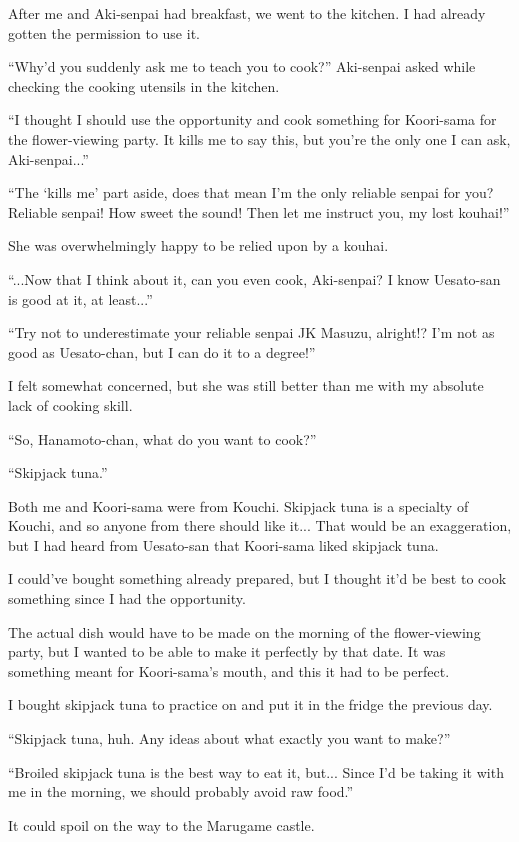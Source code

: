 After me and Aki-senpai had breakfast, we went to the kitchen. I had already gotten the permission to use it.

``Why'd you suddenly ask me to teach you to cook?'' Aki-senpai asked while checking the cooking utensils in the kitchen.

``I thought I should use the opportunity and cook something for Koori-sama for the flower-viewing party. It kills me to say this, but you're the only one I can ask, Aki-senpai...''

``The `kills me' part aside, does that mean I'm the only reliable senpai for you? Reliable senpai! How sweet the sound! Then let me instruct you, my lost kouhai!''

She was overwhelmingly happy to be relied upon by a kouhai.

``...Now that I think about it, can you even cook, Aki-senpai? I know Uesato-san is good at it, at least...''

``Try not to underestimate your reliable senpai JK Masuzu, alright!? I'm not as good as Uesato-chan, but I can do it to a degree!''

I felt somewhat concerned, but she was still better than me with my absolute lack of cooking skill.

``So, Hanamoto-chan, what do you want to cook?''

``Skipjack tuna.''

Both me and Koori-sama were from Kouchi. Skipjack tuna is a specialty of Kouchi, and so anyone from there should like it... That would be an exaggeration, but I had heard from Uesato-san that Koori-sama liked skipjack tuna.

I could've bought something already prepared, but I thought it'd be best to cook something since I had the opportunity.

The actual dish would have to be made on the morning of the flower-viewing party, but I wanted to be able to make it perfectly by that date. It was something meant for Koori-sama's mouth, and this it had to be perfect.

I bought skipjack tuna to practice on and put it in the fridge the previous day.

``Skipjack tuna, huh. Any ideas about what exactly you want to make?''

``Broiled skipjack tuna is the best way to eat it, but... Since I'd be taking it with me in the morning, we should probably avoid raw food.''

It could spoil on the way to the Marugame castle.

